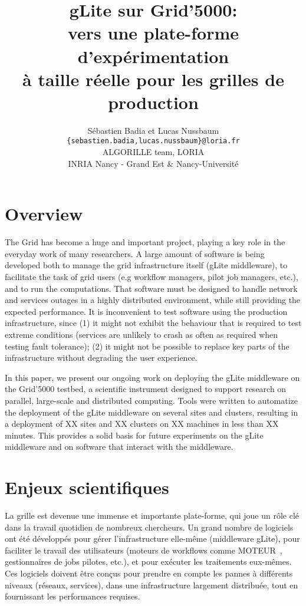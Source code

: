 \documentclass[a4paper,11pt]{article}
\title{gLite sur Grid'5000:\\ vers une plate-forme d'expérimentation\\ à taille réelle pour les grilles de production}
\date{}
\author{Sébastien Badia et Lucas Nussbaum\\
\texttt{\normalsize \{sebastien.badia,lucas.nussbaum\}@loria.fr}\\[1em]
\normalsize ALGORILLE team, LORIA\\
INRIA Nancy - Grand Est \& Nancy-Université}
\begin{document}
\maketitle

\section{Overview}

The Grid has become a huge and important project, playing a key role in the
everyday work of many researchers. A large amount of software is being developed
both to manage the grid infrastructure itself (gLite middleware),
to facilitate the task of grid users (e.g workflow managers,
pilot job managers, etc.), and to run the computations.
That software must be designed to handle network and services outages in a
highly distributed environment, while still providing the expected performance.
It is inconvenient to test software using the production infrastructure, since
(1) it might not exhibit the behaviour that is required to test extreme
conditions (services are unlikely to crash as often as required when testing
fault tolerance); (2) it might not be possible to replace key parts of the
infrastructure without degrading the user experience.

In this paper, we present our ongoing work on deploying the gLite middleware on
the Grid'5000 testbed, a scientific instrument designed to support research on
parallel, large-scale and distributed computing. Tools were written to
automatize the deployment of the gLite middleware on several sites and
clusters, resulting in a deployment of XX sites and XX clusters on XX machines
in less than XX minutes.  This provides a solid basis for future experiments on
the gLite middleware and on software that interact with the middleware.

\section{Enjeux scientifiques}

La grille est devenue une immense et importante plate-forme, qui joue un rôle
clé dans la travail quotidien de nombreux chercheurs. Un grand nombre de
logiciels ont été développés pour gérer l'infrastructure elle-même (middleware
gLite\cite{glite}), pour faciliter le travail des utilisateurs (moteurs de
workflows comme MOTEUR~\cite{moteur}, gestionnaires de jobs pilotes, etc.), et
pour exécuter les traitements eux-mêmes.
Ces logiciels doivent être conçus pour prendre en compte les pannes à
différents niveaux (réseaux, services), dans une infrastructure largement
distribuée, tout en fournissant les performances requises.
\end{document}
